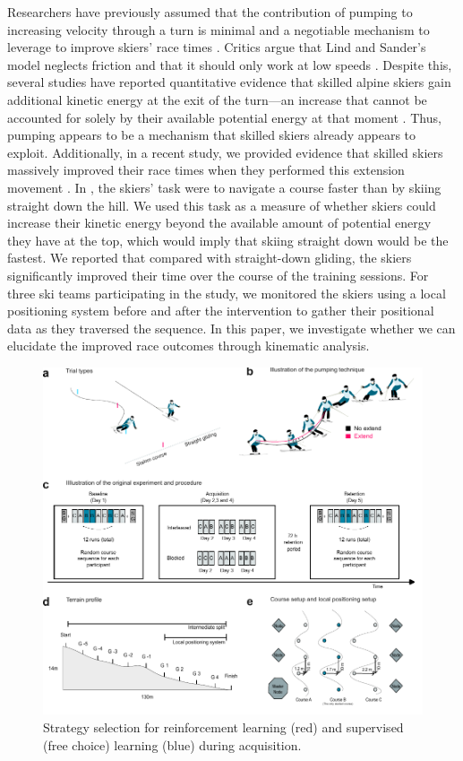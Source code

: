 \documentclass{article}
\begin{document}
Researchers have previously assumed that the contribution of pumping to increasing velocity through a turn is minimal and a negotiable mechanism to leverage to improve skiers' race times \cite{supej_differential_2008}. Critics argue that Lind and Sander's model neglects friction and that it should only work at low speeds \cite{supej_differential_2008, supej_how_2010}. Despite this, several studies have reported quantitative evidence that skilled alpine skiers gain additional kinetic energy at the exit of the turn—an increase that cannot be accounted for solely by their available potential energy at that moment \cite{reid_kinematic_2010, supej_differential_2008, supej_how_2010}. Thus, pumping appears to be a mechanism that skilled skiers already appears to exploit. Additionally, in a recent study, we provided evidence that skilled skiers massively improved their race times when they performed this extension movement \cite{magelssen_is_2022, christian_magelssen_reinforcement_2024}. In \cite{magelssen_is_2022}, the skiers' task were to navigate a course faster than by skiing straight down the hill. We used this task as a measure of whether skiers could increase their kinetic energy beyond the available amount of potential energy they have at the top, which would imply that skiing straight down would be the fastest. We reported that compared with straight-down gliding, the skiers significantly improved their time over the course of the training sessions. For three ski teams participating in the study, we monitored the skiers using a local positioning system before and after the intervention to gather their positional data as they traversed the sequence. In this paper, we investigate whether we can elucidate the improved race outcomes through kinematic analysis. 

\begin{figure}[H]
\centering
\includegraphics{figurer/figure_design.pdf}
\caption{Strategy selection for reinforcement learning (red) and supervised (free choice) learning (blue) during acquisition.}\label{fig: design}
\end{figure}
\end{document}

